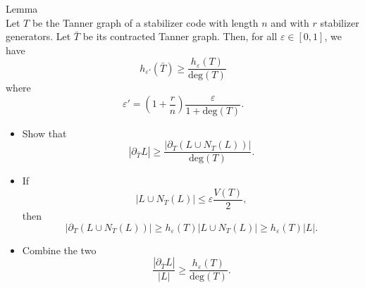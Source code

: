 \begin{frame}[c]{Lemma}
  \Large
  \hfill\\
  Let $T$ be the Tanner graph of a stabilizer code 
  with length $n$ and with $r$ stabilizer generators.
  Let $\bar T$ be its contracted Tanner graph.
  Then, for all $\varepsilon \in [0, 1]$, we have
  \begin{equation*}
    h_{\varepsilon'}(\bar T) 
    \geq 
    \frac
      {h_\varepsilon(T)}
      {\text{deg}(T)}
  \end{equation*}
  where
  \begin{equation*}
    \varepsilon' =
    \left( 1 + \frac{r}{n} \right)
    \frac{\varepsilon}{1 + \text{deg}(T)}.
  \end{equation*}
\end{frame}

\begin{frame}
  \Large
  \begin{itemize}
    \item Show that 
      $$
        \left| \partial_{\bar T} L \right|
        \geq 
        \frac
        { \left| \partial_{T}(L \cup N_T(L)) \right| }
        { \text{deg}(T) }.
      $$
    \pause
    \item If 
      $$
         \left| L \cup N_T(L) \right|
         \leq 
         \varepsilon \frac{V(T)}{2},
      $$ 
      then
      $$
         \left| \partial_{T}(L \cup N_T(L)) \right|
         \geq 
         h_{\varepsilon}(T)
         \left| L \cup N_T(L) \right|
         \geq 
         h_{\varepsilon}(T)
         \left| L \right|.
      $$
    \pause
    \item Combine the two
      $$
        \frac
          { \left| \partial_{\bar T} L \right| }
          { \left| L \right| }
        \geq 
        \frac
        {h_{\varepsilon}(T)}
        {\text{deg}(T)}.
      $$
  \end{itemize}
\end{frame}

